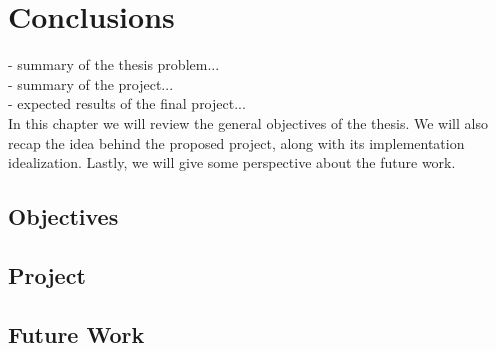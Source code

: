 \chapter{Conclusions}\label{chap:conclusions}

- summary of the thesis problem...\\
- summary of the project...\\
- expected results of the final project...\\

In this chapter we will review the general objectives of the thesis. We will
also recap the idea behind the proposed project, along with its implementation
idealization. Lastly, we will give some perspective about the future work.

\section{Objectives}

\section{Project}

\section{Future Work}
